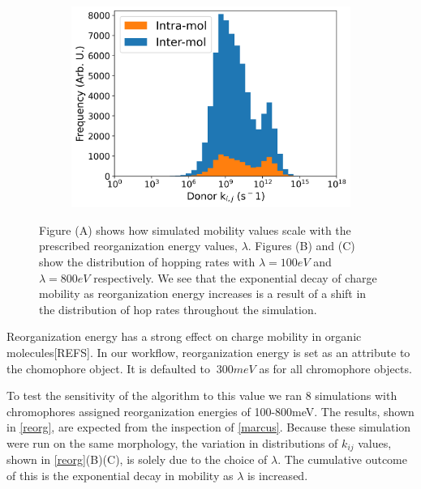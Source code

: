 \begin{figure}
\begin{subfigure}{.5\textwidth}
    \includegraphics[width=\textwidth]{figures/donor_hopping_rate_clusters_reorg800.png}
\end{subfigure}
    \caption{Figure (A) shows how  simulated mobility values scale with the prescribed
    reorganization energy values, $\lambda$. Figures (B) and (C) show the distribution of hopping rates with
    $\lambda = 100eV$ and $\lambda = 800eV$ respectively. We see that the exponential decay of charge mobility as
 reorganization energy increases is a result of a shift in the distribution of hop rates throughout the
    simulation.  
    }
\label{reorg}
\end{figure}

Reorganization energy has a strong effect on charge mobility in organic
molecules[REFS]. In our workflow, reorganization energy is set as an attribute
to the chomophore object. It is defaulted to $~300meV$ as for all chromophore
objects.

To test the sensitivity of the algorithm to this value we ran 8
simulations with chromophores assigned reorganization energies of 100-800meV. The results, shown in
\autoref{reorg}, are expected from the inspection of \autoref{marcus}. Because these simulation were run on
the same morphology, the variation in distributions of $k_{ij}$ values, shown in \autoref{reorg}(B)(C), is
solely due to the choice of $\lambda$. The cumulative outcome of this is the exponential decay in mobility as
$\lambda$ is increased.

